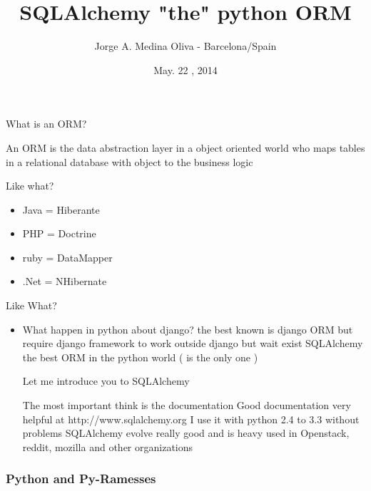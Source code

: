 \documentclass[seagull]{beamer}
\author{Jorge A. Medina Oliva - Barcelona/Spain}
\title{SQLAlchemy "the" python ORM}
\date{May. 22 , 2014}
\begin{document}
\begin{frame}
\titlepage
\end{frame}


\begin{frame}{What is an ORM?}

An ORM is the data abstraction layer in a object oriented world 
who maps tables in a relational database with object to the business logic

\end{frame}

\begin{frame}{Like what?}
\begin{itemize}
	\item Java = Hiberante
	\item PHP = Doctrine
	\item ruby = DataMapper
	\item .Net = NHibernate
\end{itemize}
\end{frame}

\begin{frame}{Like What?}
\begin{itemize}
	\item What happen in python about django?
the best known is django ORM but require django framework to work outside django
but wait exist SQLAlchemy the best ORM in the python world ( is the only one )

Let me introduce you to SQLAlchemy

The most important think is the documentation
Good documentation very helpful at http://www.sqlalchemy.org
I use it with python 2.4 to  3.3 without problems
SQLAlchemy evolve really good and is heavy used in Openstack, reddit, mozilla and other organizations
\end{itemize}
\end{frame}

\begin{frame}
\centering{}
\end{frame}

\begin{frame}
    \frametitle{Python and Py-Ramesses}
    \inputminted{python}{filename.py}
\end{frame}
\end{document}
